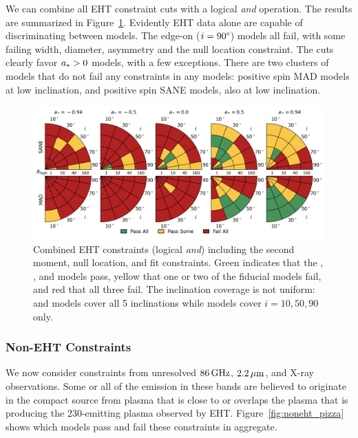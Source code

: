 
We can combine all EHT constraint cuts with a logical {\em and} operation.
The results are summarized in Figure~\ref{fig:all_EHT_constraints}.
Evidently EHT data alone are capable of discriminating between models.
The edge-on ($i = 90\degree$) models all fail, with some failing \mring width, diameter, asymmetry and the null location constraint.
The cuts clearly favor $a_* > 0$ models, with a few exceptions.
There are two clusters of models that do not fail any constraints in any models: positive spin MAD models at low inclination, and positive spin SANE models, also at low inclination.

\begin{figure}\label{fig:all_EHT_constraints}
  \centering
  \includegraphics[width=\textwidth]{./figures/Interferometric_Constraints.png}
  \caption{Combined EHT constraints (logical {\em and}) including the second moment, null location, and \mring fit constraints.
    Green indicates that the \kharma, \bhac, and \hamr models pass, yellow that one or two of the fiducial models fail, and red that all three fail.
    The inclination coverage is not uniform: \bhac and \kharma models cover all 5 inclinations while \hamr models cover $i = 10, 50, 90$ only.}
\end{figure}

\subsubsection{Non-EHT Constraints}

We now consider constraints from unresolved $86\,\mathrm{GHz}$, $2.2\,\mu\mathrm{m}$, and X-ray
observations.
Some or all of the emission in these bands are believed to originate
in the compact source from plasma that is close to or overlaps the
plasma that is producing the 230\GHz-emitting plasma observed by EHT.
Figure~\ref{fig:noneht_pizza} shows which models pass and fail these
constraints in aggregate.

